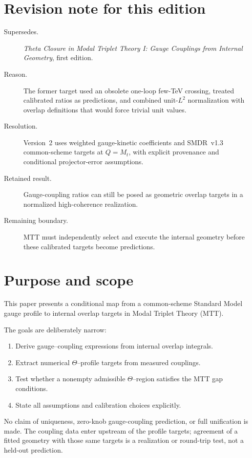 \documentclass[11pt]{article}
\begin{document}
\section*{Revision note for this edition}
\begin{description}
\item[Supersedes.] \emph{Theta Closure in Modal Triplet Theory I: Gauge
Couplings from Internal Geometry}, first edition.
\item[Reason.] The former target used an obsolete one-loop few-TeV crossing,
treated calibrated ratios as predictions, and combined unit-$L^2$
normalization with overlap definitions that would force trivial unit values.
\item[Resolution.] Version~2 uses weighted gauge-kinetic coefficients and
SMDR~v1.3 common-scheme targets at $Q=M_t$, with explicit provenance and
conditional projector-error assumptions.
\item[Retained result.] Gauge-coupling ratios can still be posed as geometric
overlap targets in a normalized high-coherence realization.
\item[Remaining boundary.] MTT must independently select and execute the
internal geometry before these calibrated targets become predictions.
\end{description}

\section{Purpose and scope}

This paper presents a conditional map from a common-scheme Standard Model gauge
profile to internal overlap targets in Modal Triplet Theory (MTT).

The goals are deliberately narrow:
\begin{enumerate}
\item Derive gauge--coupling expressions from internal overlap integrals.
\item Extract numerical $\Theta$--profile targets from measured couplings.
\item Test whether a nonempty admissible $\Theta$--region satisfies the MTT gap conditions.
\item State all assumptions and calibration choices explicitly.
\end{enumerate}

No claim of uniqueness, zero-knob gauge-coupling prediction, or full
unification is made.  The coupling data enter upstream of the profile targets;
agreement of a fitted geometry with those same targets is a realization or
round-trip test, not a held-out prediction.
\end{document}
